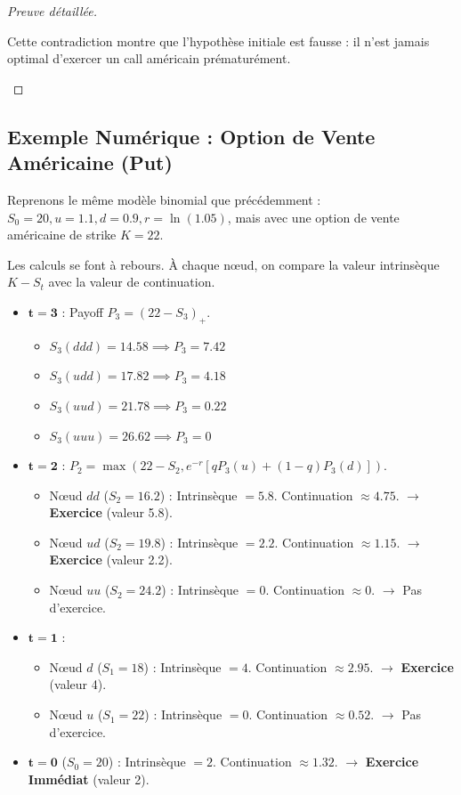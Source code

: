 \begin{proof}[Preuve détaillée]
\begin{enumerate}
    Cette contradiction montre que l'hypothèse initiale est fausse : il n'est jamais optimal d'exercer un call américain prématurément.
\end{enumerate}
\end{proof}

\subsection{Exemple Numérique : Option de Vente Américaine (Put)}
Reprenons le même modèle binomial que précédemment : $S_0=20, u=1.1, d=0.9, r=\ln(1.05)$, mais avec une option de vente américaine de strike $K=22$.

\begin{tcolorbox}[title=Arbre de Décision : Exercer ou Attendre ?, colback=blue!5!white, colframe=blue!50!black]
Les calculs se font à rebours. À chaque nœud, on compare la valeur intrinsèque $K-S_t$ avec la valeur de continuation.
\begin{itemize}
    \item $\mathbf{t=3}$ : Payoff $P_3 = (22 - S_3)_+$.
    \begin{itemize}
        \item $S_3(ddd) = 14.58 \implies P_3 = 7.42$
        \item $S_3(udd) = 17.82 \implies P_3 = 4.18$
        \item $S_3(uud) = 21.78 \implies P_3 = 0.22$
        \item $S_3(uuu) = 26.62 \implies P_3 = 0$
    \end{itemize}
    \item $\mathbf{t=2}$ : $P_2 = \max(22-S_2, e^{-r}[q P_3(u) + (1-q) P_3(d)])$.
    \begin{itemize}
        \item Nœud $dd$ ($S_2=16.2$) : Intrinsèque $= 5.8$. Continuation $\approx 4.75$. $\to$ \textbf{Exercice} (valeur 5.8).
        \item Nœud $ud$ ($S_2=19.8$) : Intrinsèque $= 2.2$. Continuation $\approx 1.15$. $\to$ \textbf{Exercice} (valeur 2.2).
        \item Nœud $uu$ ($S_2=24.2$) : Intrinsèque $= 0$. Continuation $\approx 0$. $\to$ Pas d'exercice.
    \end{itemize}
    \item $\mathbf{t=1}$ :
    \begin{itemize}
        \item Nœud $d$ ($S_1=18$) : Intrinsèque $= 4$. Continuation $\approx 2.95$. $\to$ \textbf{Exercice} (valeur 4).
        \item Nœud $u$ ($S_1=22$) : Intrinsèque $= 0$. Continuation $\approx 0.52$. $\to$ Pas d'exercice.
    \end{itemize}
    \item $\mathbf{t=0}$ ($S_0=20$) : Intrinsèque $= 2$. Continuation $\approx 1.32$. $\to$ \textbf{Exercice Immédiat} (valeur 2).
\end{itemize}
\end{tcolorbox}
